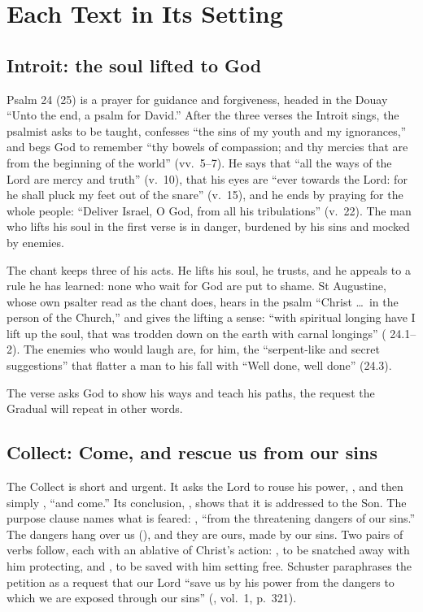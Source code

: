 \section{Each Text in Its Setting}
\label{sec:each-element}

\subsection{Introit: the soul lifted to God}
\label{sec:element-introit}

Psalm 24 (25) is a prayer for guidance and forgiveness, headed in the Douay
``Unto the end, a psalm for David.'' After the three verses the Introit sings,
the psalmist asks to be taught, confesses ``the sins of my youth and my
ignorances,'' and begs God to remember ``thy bowels of compassion; and thy
mercies that are from the beginning of the world'' (vv.~5--7). He says that
``all the ways of the Lord are mercy and truth'' (v.~10), that his eyes are
``ever towards the Lord: for he shall pluck my feet out of the snare''
(v.~15), and he ends by praying for the whole people: ``Deliver Israel, O God,
from all his tribulations'' (v.~22). The man who lifts his soul in the first
verse is in danger, burdened by his sins and mocked by enemies.

The chant keeps three of his acts. He lifts his soul, he trusts, and he
appeals to a rule he has learned: none who wait for God are put to shame.
St Augustine, whose own psalter read  as the chant does, hears in the psalm ``Christ \dots\ in the
person of the Church,'' and gives the lifting a sense: ``with spiritual
longing have I lift up the soul, that was trodden down on the earth with
carnal longings'' ( 24.1--2). The enemies who
would laugh are, for him, the ``serpent-like and secret suggestions'' that
flatter a man to his fall with ``Well done, well done'' (24.3).

The verse asks God to show his ways and teach his paths, the request the
Gradual will repeat in other words.

\subsection{Collect: Come, and rescue us from our sins}
\label{sec:element-collect}

The Collect is short and urgent. It asks the Lord to rouse his power,
, and then simply , ``and
come.'' Its conclusion, , shows that
it is addressed to the Son. The purpose clause names what is feared:
, ``from the
threatening dangers of our sins.'' The dangers hang over us
(), and they are ours, made by our sins. Two pairs of
verbs follow, each with an ablative of Christ's action: , to be snatched away with him protecting, and , to be saved with him setting free. Schuster paraphrases the petition
as a request that our Lord ``save us by his power from the dangers to which
we are exposed through our sins'' (, vol.~1, p.~321).

